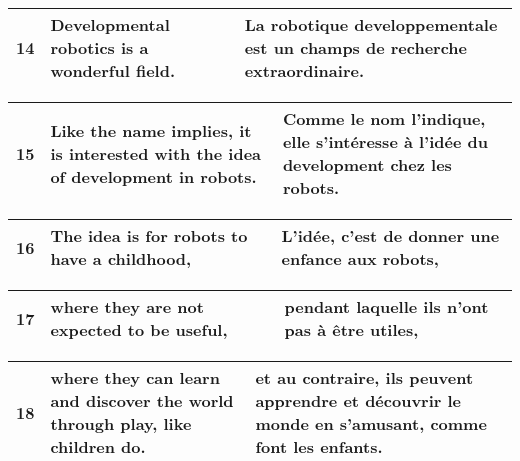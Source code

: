 \documentclass{article}
\begin{document}
\begin{tabular}{ | p{1cm} | p{8cm} | p{8cm} |}
\hline
14 & Developmental robotics is a wonderful field.
 & La robotique developpementale est un champs de recherche extraordinaire.
 \\ 
\hline
\end{tabular}

\begin{tabular}{ | p{1cm} | p{8cm} | p{8cm} |}
\hline
15 & Like the name implies, it is interested with the idea of development in robots.
 & Comme le nom l'indique, elle s'intéresse à l'idée du development chez les robots.
 \\ 
\hline
\end{tabular}

\begin{tabular}{ | p{1cm} | p{8cm} | p{8cm} |}
\hline
16 & The idea is for robots to have a childhood,
 & L'idée, c'est de donner une enfance aux robots,
 \\ 
\hline
\end{tabular}

\begin{tabular}{ | p{1cm} | p{8cm} | p{8cm} |}
\hline
17 & where they are not expected to be useful,
 & pendant laquelle ils n'ont pas à être utiles,
 \\ 
\hline
\end{tabular}

\begin{tabular}{ | p{1cm} | p{8cm} | p{8cm} |}
\hline
18 & where they can learn and discover the world through play, like children do.
 & et au contraire, ils peuvent apprendre et découvrir le monde en s'amusant, comme font les enfants.
 \\ 
\hline
\end{tabular}
\end{document}
